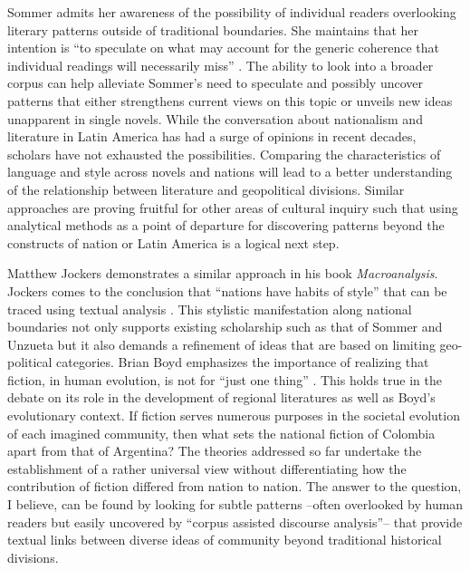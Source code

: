 \documentclass[12pt]{report}
\begin{document}
Sommer admits her awareness of the possibility of individual readers overlooking literary patterns outside of traditional boundaries. 
She maintains that her intention is \enquote{to speculate on what may account for the generic coherence that individual readings will necessarily miss} \autocite*[31]{Sommer1991}. 
The ability to look into a broader corpus can help alleviate Sommer's need to speculate and possibly uncover patterns that either strengthens current views on this topic or unveils new ideas unapparent in single novels. 
While the conversation about nationalism and literature in Latin America has had a surge of opinions in recent decades, scholars have not exhausted the possibilities. Comparing the characteristics of language and style across novels and nations will lead to a better understanding of the relationship between literature and geopolitical divisions. 
Similar approaches are proving fruitful for other areas of cultural inquiry such that using analytical methods as a point of departure for discovering patterns beyond the constructs of nation or Latin America is a logical next step. 

Matthew Jockers demonstrates a similar approach in his book \textit{Macroanalysis}.
Jockers comes to the conclusion that \enquote{nations have habits of style} that can be traced using textual analysis \autocite*[2017]{Jockers2013}.
This stylistic manifestation along national boundaries not only supports existing scholarship such as that of Sommer and Unzueta but it also demands a refinement of ideas that are based on limiting geo-political categories.
Brian Boyd emphasizes the importance of realizing that fiction, in human evolution, is not for \enquote{just one thing} \autocite*{Boyd2009}. 
This holds true in the debate on its role in the development of regional literatures as well as Boyd's evolutionary context. 
If fiction serves numerous purposes in the societal evolution of each imagined community, then what sets the national fiction of Colombia apart from that of Argentina? 
The theories addressed so far undertake the establishment of a rather universal view without differentiating how the contribution of fiction differed from nation to nation. 
The answer to the question, I believe, can be found by looking for subtle patterns --often overlooked by human readers but easily uncovered by \enquote{corpus assisted discourse analysis}-- that provide textual links between diverse ideas of community beyond traditional historical divisions. 
\end{document}
